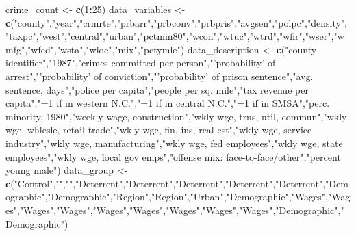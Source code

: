 \documentclass[
]{article}
\newenvironment{Shaded}{\begin{snugshade}}{\end{snugshade}}
\newcommand{\DecValTok}[1]{\textcolor[rgb]{0.00,0.00,0.81}{#1}}
\newcommand{\KeywordTok}[1]{\textcolor[rgb]{0.13,0.29,0.53}{\textbf{#1}}}
\newcommand{\NormalTok}[1]{#1}
\newcommand{\OperatorTok}[1]{\textcolor[rgb]{0.81,0.36,0.00}{\textbf{#1}}}
\newcommand{\StringTok}[1]{\textcolor[rgb]{0.31,0.60,0.02}{#1}}
\begin{document}
\begin{Shaded}
\begin{Highlighting}[]
\NormalTok{crime_count <-}\StringTok{ }\KeywordTok{c}\NormalTok{(}\DecValTok{1}\OperatorTok{:}\DecValTok{25}\NormalTok{)}
\NormalTok{data_variables <-}\StringTok{ }\KeywordTok{c}\NormalTok{(}\StringTok{"county"}\NormalTok{,}\StringTok{"year"}\NormalTok{,}\StringTok{"crmrte"}\NormalTok{,}\StringTok{"prbarr"}\NormalTok{,}\StringTok{"prbconv"}\NormalTok{,}\StringTok{"prbpris"}\NormalTok{,}\StringTok{"avgsen"}\NormalTok{,}\StringTok{"polpc"}\NormalTok{,}\StringTok{"density"}\NormalTok{,}\StringTok{"taxpc"}\NormalTok{,}\StringTok{"west"}\NormalTok{,}\StringTok{"central"}\NormalTok{,}\StringTok{"urban"}\NormalTok{,}\StringTok{"pctmin80"}\NormalTok{,}\StringTok{"wcon"}\NormalTok{,}\StringTok{"wtuc"}\NormalTok{,}\StringTok{"wtrd"}\NormalTok{,}\StringTok{"wfir"}\NormalTok{,}\StringTok{"wser"}\NormalTok{,}\StringTok{"wmfg"}\NormalTok{,}\StringTok{"wfed"}\NormalTok{,}\StringTok{"wsta"}\NormalTok{,}\StringTok{"wloc"}\NormalTok{,}\StringTok{"mix"}\NormalTok{,}\StringTok{"pctymle"}\NormalTok{)}
\NormalTok{data_description <-}\StringTok{ }\KeywordTok{c}\NormalTok{(}\StringTok{"county identifier"}\NormalTok{,}\StringTok{"1987"}\NormalTok{,}\StringTok{"crimes committed per person"}\NormalTok{,}\StringTok{"'probability' of arrest"}\NormalTok{,}\StringTok{"'probability' of conviction"}\NormalTok{,}\StringTok{"'probability' of prison sentence"}\NormalTok{,}\StringTok{"avg. sentence, days"}\NormalTok{,}\StringTok{"police per capita"}\NormalTok{,}\StringTok{"people per sq. mile"}\NormalTok{,}\StringTok{"tax revenue per capita"}\NormalTok{,}\StringTok{"=1 if in western N.C."}\NormalTok{,}\StringTok{"=1 if in central N.C."}\NormalTok{,}\StringTok{"=1 if in SMSA"}\NormalTok{,}\StringTok{"perc. minority, 1980"}\NormalTok{,}\StringTok{"weekly wage, construction"}\NormalTok{,}\StringTok{"wkly wge, trns, util, commun"}\NormalTok{,}\StringTok{"wkly wge, whlesle, retail trade"}\NormalTok{,}\StringTok{"wkly wge, fin, ins, real est"}\NormalTok{,}\StringTok{"wkly wge, service industry"}\NormalTok{,}\StringTok{"wkly wge, manufacturing"}\NormalTok{,}\StringTok{"wkly wge, fed employees"}\NormalTok{,}\StringTok{"wkly wge, state employees"}\NormalTok{,}\StringTok{"wkly wge, local gov emps"}\NormalTok{,}\StringTok{"offense mix: face-to-face/other"}\NormalTok{,}\StringTok{"percent young male"}\NormalTok{)}
\NormalTok{data_group <-}\StringTok{ }\KeywordTok{c}\NormalTok{(}\StringTok{"Control"}\NormalTok{,}\StringTok{""}\NormalTok{,}\StringTok{""}\NormalTok{,}\StringTok{"Deterrent"}\NormalTok{,}\StringTok{"Deterrent"}\NormalTok{,}\StringTok{"Deterrent"}\NormalTok{,}\StringTok{"Deterrent"}\NormalTok{,}\StringTok{"Deterrent"}\NormalTok{,}\StringTok{"Demographic"}\NormalTok{,}\StringTok{"Demographic"}\NormalTok{,}\StringTok{"Region"}\NormalTok{,}\StringTok{"Region"}\NormalTok{,}\StringTok{"Urban"}\NormalTok{,}\StringTok{"Demographic"}\NormalTok{,}\StringTok{"Wages"}\NormalTok{,}\StringTok{"Wages"}\NormalTok{,}\StringTok{"Wages"}\NormalTok{,}\StringTok{"Wages"}\NormalTok{,}\StringTok{"Wages"}\NormalTok{,}\StringTok{"Wages"}\NormalTok{,}\StringTok{"Wages"}\NormalTok{,}\StringTok{"Wages"}\NormalTok{,}\StringTok{"Wages"}\NormalTok{,}\StringTok{"Demographic"}\NormalTok{,}\StringTok{"Demographic"}\NormalTok{)}

\end{Highlighting}
\end{Shaded}
\end{document}
